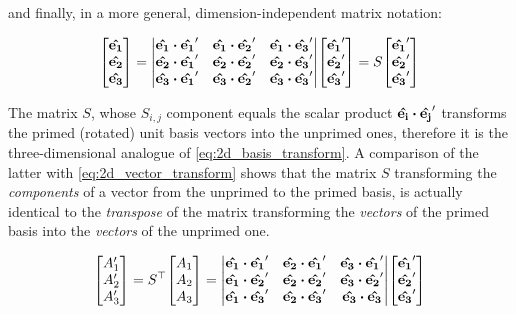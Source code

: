 and finally, in a more general, dimension-independent matrix notation: 

\begin{equation}
\mqty[\vu{e_1} \\ \vu{e_2} \\ \vu{e_3}] = \mqty|  
\vu{e_1} \vdot \vu{e_1}' & \vu{e_1} \vdot \vu{e_2}' & \vu{e_1} \vdot \vu{e_3}' \\
\vu{e_2} \vdot \vu{e_1}' & \vu{e_2} \vdot \vu{e_2}' & \vu{e_2} \vdot \vu{e_3}' \\
\vu{e_3} \vdot \vu{e_1}' & \vu{e_3} \vdot \vu{e_2}' & \vu{e_3} \vdot \vu{e_3}' |
\mqty[\vu{e_1}' \\ \vu{e_2}' \\ \vu{e_3}']
= S \mqty[\vu{e_1}' \\ \vu{e_2}' \\ \vu{e_3}']
\label{eq:3d_basis_transform}
\end{equation}

The matrix $S$, whose $S_{i,j}$ component equals the scalar product $\vu{e_i} \vdot \vu{e_j}'$ transforms the primed (rotated) unit basis vectors into the unprimed ones, therefore it is the three-dimensional analogue of \ref{eq:2d_basis_transform}. A comparison of the latter with \ref{eq:2d_vector_transform}  shows that the matrix $S$ transforming the \textit{components} of a vector from the unprimed to the primed basis, is actually identical to the \textit{transpose} of the matrix transforming the \textit{vectors} of the primed basis into the \textit{vectors} of the unprimed one. 

\begin{equation}
\mqty[A_1' \\ A_2' \\ A_3'] = S^\top \mqty[A_1 \\ A_2 \\ A_3] = \mqty|
\vu{e_1} \vdot \vu{e_1}' & \vu{e_2} \vdot \vu{e_1}' & \vu{e_3} \vdot \vu{e_1}' \\
\vu{e_1} \vdot \vu{e_2}' & \vu{e_2} \vdot \vu{e_2}' & \vu{e_3} \vdot \vu{e_2}' \\
\vu{e_1} \vdot \vu{e_3}' & \vu{e_2} \vdot \vu{e_3}' & \vu{e_3} \vdot \vu{e_3}  |
\mqty[\vu{e_1}' \\ \vu{e_2}' \\ \vu{e_3}']
\label{eq:3d_components_transform}
\end{equation}

